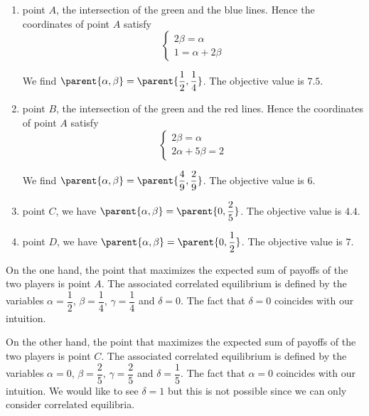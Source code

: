 \begin{enumerate}
    \item point $A$, the intersection of the green and the blue lines. Hence the coordinates of point $A$ satisfy
    \begin{equation*}
       \begin{cases}
        2 \beta = \alpha  \\
        1 = \alpha + 2 \beta
        \end{cases}
    \end{equation*}

    We find $\parent{\alpha, \beta} = \parent{\dfrac{1}{2}, \dfrac{1}{4}}$. The objective value is $7.5$.

    \item point $B$, the intersection of the green and the red lines. Hence the coordinates of point $A$ satisfy
    \begin{equation*}
       \begin{cases}
        2 \beta = \alpha  \\
        2 \alpha + 5 \beta = 2
        \end{cases}
    \end{equation*}

    We find $\parent{\alpha, \beta} = \parent{\dfrac{4}{9}, \dfrac{2}{9}}$. The objective value is $6$.

    \item point $C$, we have $\parent{\alpha, \beta} = \parent{0, \dfrac{2}{5}}$. The objective value is $4.4$.

    \item point $D$, we have $\parent{\alpha, \beta} = \parent{0, \dfrac{1}{2}}$. The objective value is $7$.
\end{enumerate}

On the one hand, the point that maximizes the expected sum of payoffs of the two players is point $A$. The associated correlated equilibrium is defined by the variables $\alpha = \dfrac{1}{2}$, $\beta = \dfrac{1}{4}$, $\gamma = \dfrac{1}{4}$ and $\delta = 0$. The fact that $\delta = 0$ coincides with our intuition.



On the other hand, the point that maximizes the expected sum of payoffs of the two players is point $C$. The associated correlated equilibrium is defined by the variables $\alpha = 0$, $\beta = \dfrac{2}{5}$, $\gamma = \dfrac{2}{5}$ and $\delta = \dfrac{1}{5}$. The fact that $\alpha = 0$ coincides with our intuition. We would like to see $\delta = 1$ but this is not possible since we can only consider correlated equilibria.
